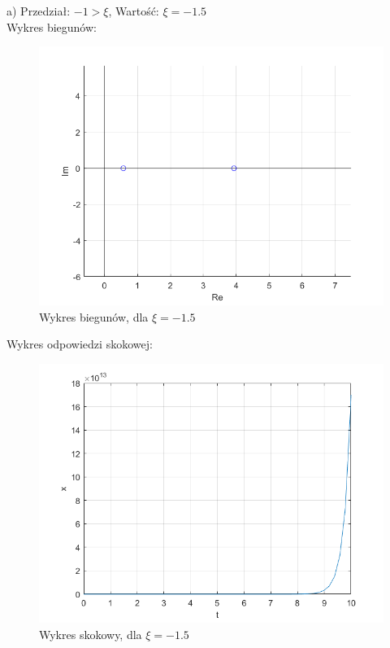 \documentclass{article}
\begin{document}
\begin{flushleft}
 a)  Przedział: $-1>\xi$, Wartość: $\xi=-1.5$\\
 
 
  Wykres biegunów:\\
 \begin{figure}[h!]
    \centering
    \includegraphics[scale=0.6]{bieguny_ksi_-1_5.png}
    \caption{Wykres biegunów, dla $\xi=-1.5$}
    \label{fig:bieguny_ksi_-1_5}
 \end{figure}
 
 
 Wykres odpowiedzi skokowej:\\
 \begin{figure}[h!]
    \centering
    \includegraphics[scale=0.6]{ksi_-1_5.png}
    \caption{Wykres skokowy, dla $\xi=-1.5$}
    \label{fig:ksi_-1_5}
 \end{figure}
 

\end{flushleft}
\end{document}
